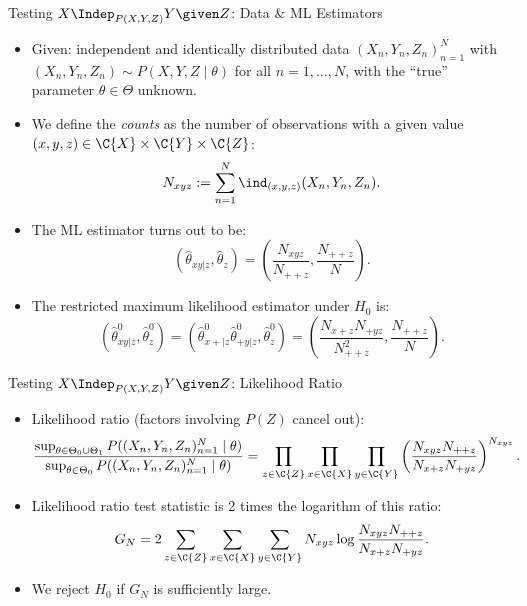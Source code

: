 \begin{frame}{Testing $X \Indep_{P(X,Y,Z)} Y \given Z$: Data \& ML Estimators}
  \begin{itemize}
    \item Given: independent and identically distributed data $(X_n,Y_n,Z_n)_{n=1}^N$ with
$(X_n,Y_n,Z_n) \sim P(X,Y,Z \mid \theta)$ for all $n=1,\dots,N$, with the ``true'' parameter $\theta \in \Theta$
unknown.
\item We define the \emph{counts} as the number of observations with a given value $(x,y,z)\in\C{X}\times\C{Y}\times\C{Z}$:
$$N_{xyz} := \sum_{n=1}^N \ind_{(x,y,z)}(X_n,Y_n,Z_n).$$

    \item The ML estimator turns out to be:
$$\left(\hat \theta_{xy|z},\hat \theta_z\right) = \left(\frac{N_{xyz}}{N_{++ z}},\frac{N_{++ z}}{N}\right).$$
    \item The restricted maximum likelihood estimator under $H_0$ is:
$$\left(\hat \theta^0_{xy|z},\hat \theta^0_z\right) = \left(\hat \theta^0_{x+|z} \hat \theta^0_{+ y|z},\hat \theta^0_z\right) = \left(\frac{N_{x+ z} N_{+ y z}}{N_{++ z}^2},\frac{N_{++ z}}{N}\right).$$
  \end{itemize}
\end{frame}

\begin{frame}{Testing $X \Indep_{P(X,Y,Z)} Y \given Z$: Likelihood Ratio}
  \begin{itemize}
    \item Likelihood ratio (factors involving $P(Z)$ cancel out):
      \begin{equation*}\begin{split}
      \frac{\sup_{\theta\in\Theta_0\cup\Theta_1} P((X_n,Y_n,Z_n)_{n=1}^N \mid \theta)}{\sup_{\theta\in\Theta_0} P((X_n,Y_n,Z_n)_{n=1}^N \mid \theta)}
        & = \prod_{z\in\C{Z}} \prod_{x\in\C{X}} \prod_{y\in\C{Y}} \left(\frac{N_{xyz} N_{++ z}}{N_{x+ z} N_{+ y z}}\right)^{N_{xyz}}.
      \end{split}\end{equation*}
    \item Likelihood ratio test statistic is 2 times the logarithm of this ratio:
      \begin{equation*}
      G_N = 2 \sum_{z\in\C{Z}} \sum_{x\in\C{X}} \sum_{y\in\C{Y}} N_{xyz} \log \frac{N_{xyz} N_{+ + z}}{N_{x+ z} N_{+ y z}}.
      \end{equation*}
    \item We reject $H_0$ if $G_N$ is sufficiently large.
  \end{itemize}
\end{frame}

